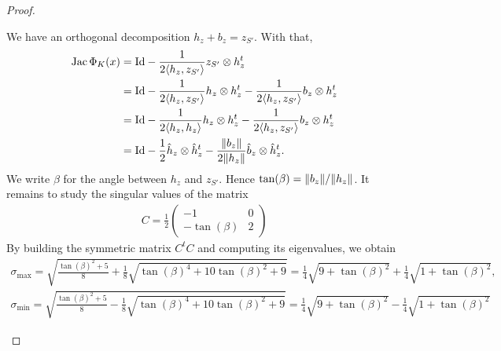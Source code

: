 \documentclass[10pt,letterpaper]{article}
\begin{document}
\begin{proof}
\begin{itemize}
        We have an orthogonal decomposition $h_{z} + b_{z} = z_{S'}$.
        With that,
        \begin{align*}
            \operatorname{{\rm Jac}} \Phi_{K}(x)
            &=
            {\rm Id} 
            - 
            \frac{1}{ 2 \langle h_{z},z_{S'}\rangle }  
            z_{S'} \otimes h_{z}^{t}
            \\
            &=
            {\rm Id} 
            - 
            \frac{1}{ 2 \langle h_{z},z_{S'}\rangle } 
            h_{z} \otimes h_{z}^{t}
            - 
            \frac{1}{ 2 \langle h_{z},z_{S'}\rangle } 
            b_{z} \otimes h_{z}^{t}
            \\
            &=
            {\rm Id} 
            - 
            \frac{1}{ 2 \langle h_{z}, h_{z}\rangle } 
            h_{z} \otimes h_{z}^{t}
            - 
            \frac{1}{ 2 \langle h_{z},z_{S'}\rangle } 
            b_{z} \otimes h_{z}^{t}
            \\
            &=
            {\rm Id} 
            - 
            \frac{1}{ 2 } 
            \hat h_{z} \otimes \hat h_{z}^{t}
            - 
            \frac{ \|  b_{z}  \| }{ 2 \|  h_{z}  \| } 
            \hat b_{z} \otimes \hat h_{z}^{t}
            .
        \end{align*}
        We write $\beta$ for the angle between $h_{z}$ and $z_{S'}$.
        Hence $\tan(\beta) = \|  b_{z}  \| / \|  h_{z}  \|$. It remains to study the singular values of the matrix 
        \begin{align*}
            C 
            = 
            \frac 1 2 
            \begin{pmatrix}
                -1 & 0 
                \\
                -\tan(\beta) & 2 
            \end{pmatrix}
        \end{align*}
        By building the symmetric matrix $C^{t} C$ and computing its eigenvalues, we obtain 
        \begin{align*}
            \sigma_{\max} 
            = 
            \sqrt{ \frac{ \tan(\beta)^{2} + 5 }{8} + \frac 1 8 \sqrt{ \tan(\beta)^{4} + 10 \tan(\beta)^{2} + 9 } }
            =
            \frac 1 4 \sqrt{ 9 + \tan(\beta)^2 } + \frac 1 4 \sqrt{ 1 + \tan(\beta)^2 }
            ,
            \\
            \sigma_{\min} 
            = 
            \sqrt{ \frac{ \tan(\beta)^{2} + 5 }{8} - \frac 1 8 \sqrt{ \tan(\beta)^{4} + 10 \tan(\beta)^{2} + 9 } }
            =
            \frac 1 4 \sqrt{ 9 + \tan(\beta)^2 } - \frac 1 4 \sqrt{ 1 + \tan(\beta)^2 }

\end{align*}
\end{itemize}
\end{proof}
\end{document}
